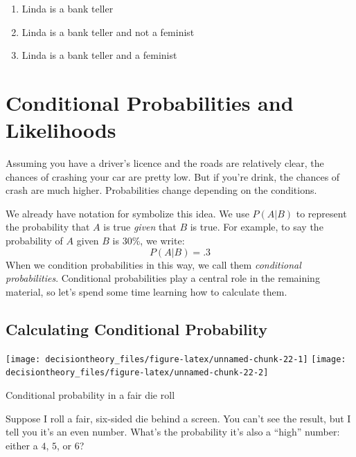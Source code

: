 \documentclass[]{tufte-book}
\providecommand{\tightlist}{%
  \setlength{\itemsep}{0pt}\setlength{\parskip}{0pt}}
\begin{document}
\begin{enumerate}
\def\labelenumi{\arabic{enumi}.}
\tightlist
\item
  Linda is a bank teller
\item
  Linda is a bank teller and not a feminist
\item
  Linda is a bank teller and a feminist
\end{enumerate}

\hypertarget{conditional-probabilities-and-likelihoods}{%
\chapter{Conditional Probabilities and Likelihoods}\label{conditional-probabilities-and-likelihoods}}

Assuming you have a driver's licence and the roads are relatively clear, the chances of crashing your car are pretty low. But if you're drink, the chances of crash are much higher. Probabilities change depending on the conditions.

We already have notation for symbolize this idea. We use \(P(A | B)\) to represent the probability that \(A\) is true \emph{given} that \(B\) is true. For example, to say the probability of \(A\) given \(B\) is 30\%, we write:
\[ P(A | B) = .3 \]
When we condition probabilities in this way, we call them \emph{conditional probabilities}. Conditional probabilities play a central role in the remaining material, so let's spend some time learning how to calculate them.

\hypertarget{calculating-conditional-probability}{%
\section{Calculating Conditional Probability}\label{calculating-conditional-probability}}

\begin{marginfigure}
\texttt{[image: decisiontheory\_files/figure-latex/unnamed-chunk-22-1]} \texttt{[image: decisiontheory\_files/figure-latex/unnamed-chunk-22-2]} \caption[Conditional probability in a fair die roll]{Conditional probability in a fair die roll}\label{fig:unnamed-chunk-22}
\end{marginfigure}

Suppose I roll a fair, six-sided die behind a screen. You can't see the result, but I tell you it's an even number. What's the probability it's also a ``high'' number: either a \(4\), \(5\), or \(6\)?
\end{document}
